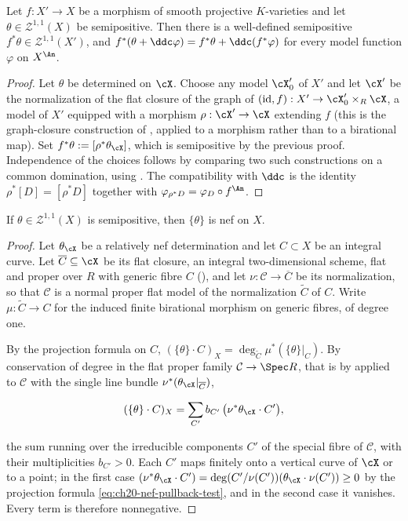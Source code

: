 \begin{corollary}
\label{cor:ch20-pullback-varieties}
Let $f:X'\to X$ be a morphism of smooth projective $K$-varieties and let
$\theta\in\mathcal Z^{1,1}(X)$ be semipositive.  Then there is a
well-defined semipositive $f^*\theta\in\mathcal Z^{1,1}(X')$, and
$f^*(\theta+\ddc\varphi)=f^*\theta+\ddc(f^*\varphi)$ for every model
function $\varphi$ on $X^{\An}$.
\end{corollary}

\begin{proof}
Let $\theta$ be determined on $\cX$.  Choose any model $\cX'_0$ of
$X'$ and let $\cX'$ be the normalization of the flat closure of the graph of
$(\mathrm{id},f):X'\to\cX'_0\times_R\cX$, a model of $X'$ equipped with a
morphism $\rho:\cX'\to\cX$ extending $f$ (this is the graph-closure
construction of , applied to a morphism rather
than to a birational map).  Set $f^*\theta:=[\rho^*\theta_{\cX}]$, which is
semipositive by the previous proof.  Independence of the choices follows by
comparing two such constructions on a common domination, using
.  The compatibility with $\ddc$ is
the identity $\rho^*[D]=[\rho^*D]$ together with
$\varphi_{\rho^*D}=\varphi_D\circ f^{\An}$.
\end{proof}

\begin{corollary}
\label{cor:ch20-semipositive-generic-nef}
If $\theta\in\mathcal Z^{1,1}(X)$ is semipositive, then $\{\theta\}$ is nef on
$X$.
\end{corollary}

\begin{proof}
Let $\theta_{\cX}$ be a relatively nef determination and let $C\subset X$
be an integral curve.  Let $\overline C\subseteq\cX$ be its flat closure,
an integral two-dimensional scheme, flat and proper over $R$ with generic
fibre $C$ (), and let
$\nu:\mathcal C\to\overline C$ be its normalization, so that
$\mathcal C$ is a normal proper flat model of the normalization
$\widetilde C$ of $C$.  Write $\mu:\widetilde C\to C$ for the induced
finite birational morphism on generic fibres, of degree one.

By the projection formula on $C$,
$(\{\theta\}\cdot C)_X=\deg_{\widetilde C}\mu^*(\{\theta\}|_C)$.  By
conservation of degree in the flat proper family
$\mathcal C\to\Spec R$, that is by
 applied to $\mathcal C$ with the single
line bundle $\nu^*(\theta_{\cX}|_{\overline C})$,

\[
 (\{\theta\}\cdot C)_X
 =\sum_{C'}b_{C'}\,\bigl(\nu^*\theta_{\cX}\cdot C'\bigr),
\]

the sum running over the irreducible components $C'$ of the special fibre
of $\mathcal C$, with their multiplicities $b_{C'}>0$.  Each $C'$ maps
finitely onto a vertical curve of $\cX$ or to a point; in the first case
$(\nu^*\theta_{\cX}\cdot C')=\deg(C'/\nu(C'))(\theta_{\cX}\cdot\nu(C'))\geq0$
by the projection formula \eqref{eq:ch20-nef-pullback-test}, and in the
second case it vanishes.  Every term is therefore nonnegative.
\end{proof}

